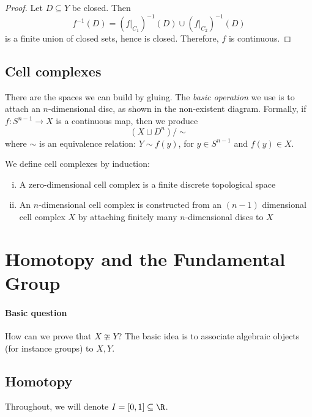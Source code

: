 \documentclass{article}
\numberwithin{nthm}{subsection}
\begin{document}
\begin{proof}
    Let $D \subseteq Y$ be closed.  Then
    \begin{equation*}
        f^{-1}(D) = (f|_{C_1})^{-1} (D) \cup (f|_{C_2})^{-1} (D)
    \end{equation*}
    is a finite union of closed sets, hence is closed.  Therefore, $f$ is continuous.
\end{proof}

\subsection{Cell complexes}
There are the spaces we can build by gluing.  The \emph{basic operation} we use is to attach an $n$-dimensional disc, as shown in the non-existent diagram.
Formally, if $f: S^{n-1} \to X$ is a continuous map, then we produce
\begin{equation}
    (X \sqcup D^n) / \sim
\end{equation}
where $\sim$ is an equivalence relation: $Y \sim f(y)$, for $y \in S^{n-1}$ and $f(y) \in X$.
\begin{defi}
    We define cell complexes by induction:
    \begin{enumerate}[(i)]
        \item A zero-dimensional cell complex is a finite discrete topological space
        \item An $n$-dimensional cell complex is constructed from an $(n-1)$ dimensional cell complex $X$ by attaching finitely many $n$-dimensional discs to $X$
    \end{enumerate}
\end{defi}

\section{Homotopy and the Fundamental Group}
\paragraph{Basic question} How can we prove that $X \ncong Y$?
The basic idea is to associate algebraic objects (for instance groups) to $X, Y$.
\clearpage
\subsection{Homotopy}
Throughout, we will denote $I = [0, 1] \subseteq \R$.

\end{document}
